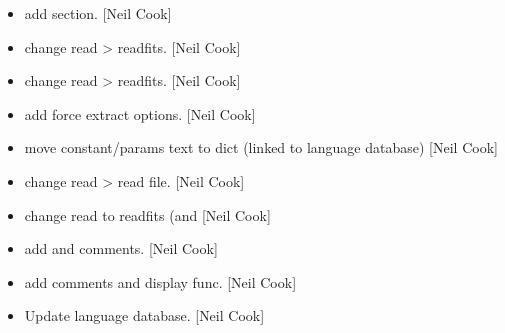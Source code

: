 \documentclass[a4paper,10pt,english]{report}
\begin{document}
\begin{itemize}
\item {} 
 \sphinxhyphen{} add  section. {[}Neil Cook{]}

\item {} 
 \sphinxhyphen{} change read \textendash{}\textgreater{} readfits. {[}Neil Cook{]}

\item {} 
 \sphinxhyphen{} change read \textendash{}\textgreater{} readfits. {[}Neil Cook{]}

\item {} 
 \sphinxhyphen{} add force extract
options. {[}Neil Cook{]}

\item {} 
 \sphinxhyphen{} move constant/params text to dict (linked
to language database) {[}Neil Cook{]}

\item {} 
 \sphinxhyphen{} change read \textendash{}\textgreater{} read file. {[}Neil Cook{]}

\item {} 
 \sphinxhyphen{} change read to readfits (and
 {[}Neil Cook{]}

\item {} 
 \sphinxhyphen{} add  and comments.
{[}Neil Cook{]}

\item {} 
 \sphinxhyphen{} add comments and display func.
{[}Neil Cook{]}

\item {} 
Update language database. {[}Neil Cook{]}

\end{itemize}
\end{document}
